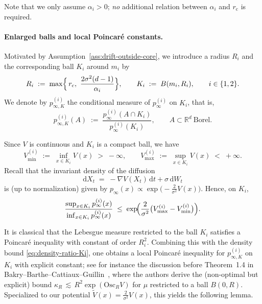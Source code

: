 Note that we only assume \(\alpha_i>0\); \emph{no} additional relation between
\(\alpha_i\) and \(r_{\mathrm c}\) is required.

\paragraph{Enlarged balls and local Poincar\'e constants.}
Motivated by Assumption~\ref{ass:drift-outside-core}, we introduce a radius
\(R_i\) and the corresponding ball \(K_i\) around \(m_i\) by
\begin{equation}\label{eq:Ri-Ki-def}
R_i
\;:=\;
\max\Bigl\{\,r_{\mathrm c},\ \frac{2\sigma^2(d-1)}{\alpha_i}\Bigr\},
\qquad
K_i \;:=\; B(m_i,R_i),
\qquad
i\in\{1,2\}.
\end{equation}
We denote by \(p_{\infty,K}^{(i)}\) the conditional measure of \(p_\infty^{(i)}\)
on \(K_i\), that is,
\[
p_{\infty,K}^{(i)}(A)
\;:=\;
\frac{p_\infty^{(i)}(A\cap K_i)}{p_\infty^{(i)}(K_i)},
\qquad
A\subset\mathbb R^d\ \text{Borel}.
\]

Since \(V\) is continuous and \(K_i\) is a compact ball, we have
\[
V_{\min}^{(i)} \;:=\; \inf_{x\in K_i} V(x) \;>\; -\infty,
\qquad
V_{\max}^{(i)} \;:=\; \sup_{x\in K_i} V(x) \;<\; +\infty.
\]
Recall that the invariant density of the diffusion
\[
\mathrm dX_t \;=\; -\nabla V(X_t)\,\mathrm dt + \sigma\,\mathrm dW_t
\]
is (up to normalization) given by
\(
p_\infty(x)\propto \exp\!\bigl(-\tfrac{2}{\sigma^2}V(x)\bigr)
\).
Hence, on \(K_i\),
\begin{equation}\label{eq:density-ratio-Ki}
\frac{\sup_{x\in K_i} p_\infty^{(i)}(x)}{\inf_{x\in K_i} p_\infty^{(i)}(x)}
\;\le\;
\exp\!\Bigl(\frac{2}{\sigma^2}\bigl(V_{\max}^{(i)}-V_{\min}^{(i)}\bigr)\Bigr).
\end{equation}

It is classical that the Lebesgue measure restricted to the ball \(K_i\) satisfies
a Poincar\'e inequality with constant of order \(R_i^2\).
Combining this with the density bound \eqref{eq:density-ratio-Ki}, one obtains
a local Poincar\'e inequality for \(p_{\infty,K}^{(i)}\) on \(K_i\) with explicit
constant; see for instance the discussion before Theorem~1.4 in
Bakry--Barthe--Cattiaux--Guillin~\cite{bakry2008simple}, where the authors
derive the (non-optimal but explicit) bound
\(
\kappa_R \,\lesssim\, R^2 \exp(\mathrm{Osc}_R V)
\)
for \(\mu\) restricted to a ball \(B(0,R)\).
Specialized to our potential \(\tilde V(x)=\tfrac{2}{\sigma^2}V(x)\), this yields
the following lemma.

